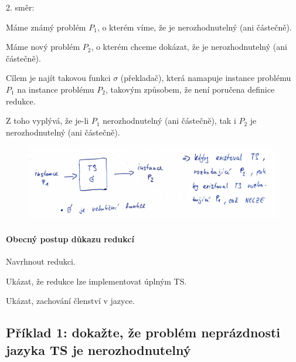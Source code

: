 \begin{compactitem}
    \item 2. směr: \begin{compactitem}
        \item Máme známý problém $P_1$, o kterém víme, že je nerozhodnutelný (ani částečně).

        \item Máme nový problém $P_2$, o kterém chceme dokázat, že je nerozhodnutelný (ani částečně).

        \item Cílem je najít takovou funkci $\sigma$ (překladač), která namapuje instance problému $P_1$ na instance problému $P_2$, takovým způsobem, že není poručena definice redukce.

        \item Z toho vyplývá, že je-li $P_1$ nerozhodnutelný (ani částečně), tak i $P_2$ je nerozhodnutelný (ani částečně).
    \end{compactitem}

    \begin{figure}[H]
        \centering
        \includegraphics[width=1\linewidth]{redukce_2.pdf}
    \end{figure}
\end{compactitem}

\paragraph*{Obecný postup důkazu redukcí} \begin{compactenum}
    \item Navrhnout redukci.
    \item Ukázat, že redukce lze implementovat úplným TS.
    \item Ukázat, zachování členství v jazyce.
\end{compactenum}

\subsection*{Příklad 1: dokažte, že problém neprázdnosti jazyka TS je nerozhodnutelný}

